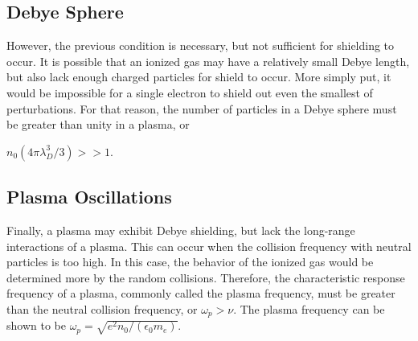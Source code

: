 \subsection{Debye Sphere}
However, the previous condition is necessary, but not sufficient for shielding
to occur. It is possible that an ionized gas may have a relatively small Debye
length, but also lack enough charged particles for shield to occur. More simply
put, it would be impossible for a single electron to shield out even the
smallest of perturbations. For that reason, the number of particles in a Debye
sphere must be greater than unity in a plasma, or {$n_0(4\pi \lambda_D^3/3) >>
1$.

\subsection{Plasma Oscillations}
Finally, a plasma may exhibit Debye shielding, but lack the long-range
interactions of a plasma. This can occur when the collision frequency with
neutral particles is too high. In this case, the behavior of the ionized gas
would be determined more by the random collisions. Therefore, the characteristic
response frequency of a plasma, commonly called the plasma frequency, must be
greater than the neutral collision frequency, or {$\omega_p > \nu$}. The plasma
frequency can be shown to be $\omega_p = \sqrt{e^2n_0/(\epsilon_0 m_e)}$.

}
